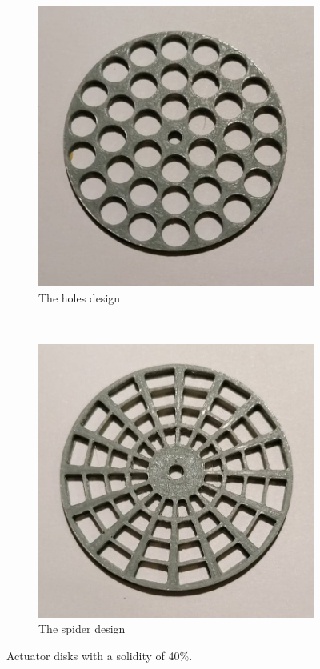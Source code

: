 \begin{figure} [h!]
    \centering
    \begin{subfigure}[b]{0.45\linewidth}
        \includegraphics[width=\textwidth]{0_Images/holes40.jpg}
        \caption{The \gls{holes} design}
        \label{Fig:holes40}
    \end{subfigure}
    ~
    \begin{subfigure}[b]{0.45\linewidth}
        \includegraphics[width=\textwidth]{0_Images/spider40.jpg}
        \caption{The \gls{spider} design}
        \label{Fig:spider40}
    \end{subfigure}
    \caption{Actuator disks with a solidity of 40\%.}
    \label{Fig:40Sol}
\end{figure}

